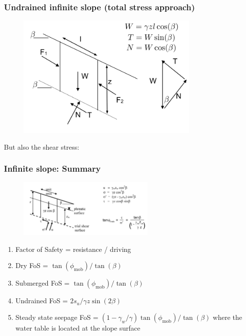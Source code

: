 \documentclass[notes]{beamer}
\begin{document}
\begin{frame}
\frametitle{Undrained infinite slope (total stress approach)}
\begin{figure}[ht]
\centering
\includegraphics[width=0.8\textwidth]{figs/undrained-infinite-slope.png}
\end{figure}
But also the shear stress: 
\end{frame}


\begin{frame}
\frametitle{Infinite slope: Summary}
\begin{figure}[ht]
\centering
\includegraphics[width=0.6\textwidth]{figs/infinite-slope.png}
\end{figure}
\begin{enumerate}
\item Factor of Safety = resistance / driving
\item Dry FoS = $\tan(\phi_{\mathrm{mob}})/\tan(\beta)$
\item Submerged FoS = $\tan(\phi_{\mathrm{mob}})/\tan(\beta)$
\item Undrained FoS = $2 s_u / \gamma z \sin(2 \beta)$
\item Steady state seepage FoS = $(1 - \gamma_w/ \gamma) \tan(\phi_{\mathrm{mob}})/\tan(\beta)$ where the water table is located at the slope surface
\end{enumerate}
\end{frame}
\end{document}
